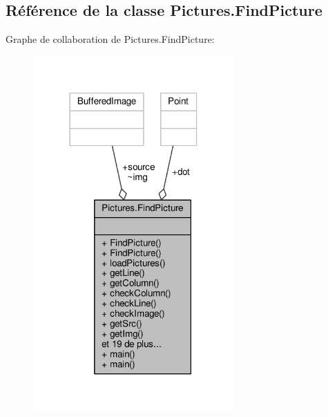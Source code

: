 \hypertarget{classPictures_1_1FindPicture}{}\subsection{Référence de la classe Pictures.\+Find\+Picture}
\label{classPictures_1_1FindPicture}


Graphe de collaboration de Pictures.\+Find\+Picture\+:\nopagebreak
\begin{figure}[H]
\begin{center}
\leavevmode
\includegraphics[width=218pt]{classPictures_1_1FindPicture__coll__graph}
\end{center}
\end{figure}

